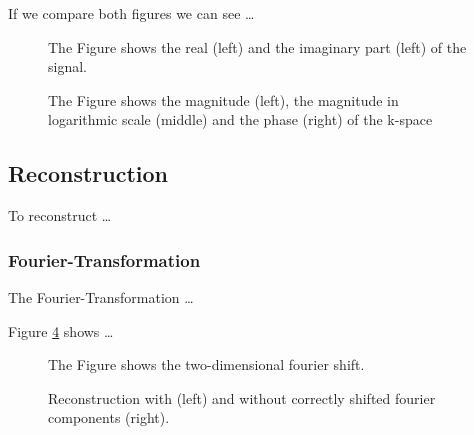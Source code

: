 \documentclass[%
	a4paper, %
	12pt, %
	english, %
	bibtotoc %
]{scrartcl}
\begin{document}
If we compare both figures we can see \dots


\begin{figure}
    \centering
    \vspace{5cm}
    \caption{The Figure shows the real (left) and the imaginary part (left) of the signal.}
    \label{fig:real_imag}
\end{figure}

\begin{figure}
    \centering
    \vspace{5cm}
    \caption{The Figure shows the magnitude (left), the magnitude in logarithmic scale (middle) and the phase (right) of the k-space}
    \label{fig:mag_phas}
\end{figure}



\subsection{Reconstruction}
To reconstruct \dots

\subsubsection{Fourier-Transformation}
The Fourier-Transformation \dots

Figure \ref{fig:Verschiebung} shows \dots

\begin{figure}
    \centering
    \vspace{5cm}
    \caption{The Figure shows the two-dimensional fourier shift.}
    \label{fig:Verschiebung}
\end{figure}


\begin{figure}
    \centering
    \vspace{5cm}
    \caption{Reconstruction with (left) and without correctly shifted fourier components (right).}
    \label{fig:Verschiebung}
\end{figure}
\end{document}
